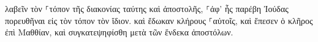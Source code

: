 \documentclass{openreader}
\begin{document}
λαβεῖν τὸν ⸀τόπον τῆς διακονίας ταύτης καὶ ἀποστολῆς, ⸀ἀφ’ ἧς παρέβη Ἰούδας πορευθῆναι εἰς τὸν τόπον τὸν ἴδιον. 
καὶ ἔδωκαν κλήρους ⸀αὐτοῖς, καὶ ἔπεσεν ὁ κλῆρος ἐπὶ Μαθθίαν, καὶ συγκατεψηφίσθη μετὰ τῶν ἕνδεκα ἀποστόλων. 
\end{document}
